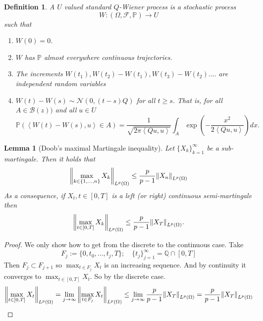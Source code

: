 \documentclass[12pt]{article}
\newcommand{\br}[1]{\left\langle#1\right\rangle}
\newcommand{\R}zzzzz
\newcommand{\PP}{{\mathbb P}}
\newtheorem{lemma}{Lemma}
\newtheorem{definition}{Definition}
\begin{document}
\begin{definition}
	A $U$ valued standard $Q$-Wiener process is a stochastic process
	\begin{equation*}
		W:(\Omega,\mathcal{F},\mathbb{P})\to U
	\end{equation*}
	such that
	\begin{enumerate}
		\item $W(0)=0$.
		\item $W$ has $\PP$ almost everywhere continuous trajectories.
		\item The increments $W(t_1),W(t_2)-W(t_1),W(t_3)-W(t_2)....$ are independent random variables
		\item $W(t)-W(s)\sim \mathcal{N}(0,(t-s)Q)$ for all $t\geq s$. That is, for all $A\in\mathcal{B}(\R))$ and all $u\in U$
		      \begin{equation*}
			      \mathbb{P}(\br{W(t)-W(s),u}\in A)=\frac{1}{\sqrt{2\pi\br{Qu,u}}}\int_A\exp(-\frac{x^2}{2\br{Qu,u}})dx.
		      \end{equation*}
	\end{enumerate}
\end{definition}
\begin{lemma}[Doob's maximal Martingale inequality]
	Let $\{X_k\}_{k=1}^\infty$ be a sub-martingale. Then it holds that
	\begin{equation*}
		\norm{\max_{k\in\{1,...,n\}}X_k}_{L^p(\Omega)}\leq \frac{p}{p-1}\norm{X_n}_{L^p(\Omega)}
	\end{equation*}
	As a consequence, if $X_t,t\in[0,T]$ is a left (or right) continuous semi-martingale then
	\begin{equation*}
		\norm{\max_{t\in[0,T]}X_k}_{L^p(\Omega)}\leq \frac{p}{p-1}\norm{X_T}_{L^p(\Omega)}.
	\end{equation*}
\end{lemma}
\begin{proof}
	We only show how to get from the discrete to the continuous case. Take
	\begin{equation*}
		F_j:= \{0,t_0,...,t_j,T\}; \quad \{t_j\}_{j=1}^\infty =\mathbb{Q}\cap [0,T]
	\end{equation*}
	Then $F_j\subset F_{j+1}$ so $\max_{t\in F_j}X_t$ is an increasing sequence. And by continuity it converges to $\max_{t\in[0,T]}X_t$. So by the discrete case.
	\begin{equation*}
		\norm{\max_{t\in[0,T]}X_t}_{L^p(\Omega)}=\lim_{j\to\infty}\norm{\max_{t\in F_j}X_t}_{L^p(\Omega)}\leq \lim_{j\to\infty}\frac{p}{p-1}\norm{X_T}_{L^p(\Omega)}=\frac{p}{p-1}\norm{X_T}_{L^p(\Omega)}
	\end{equation*}
\end{proof}
\end{document}
